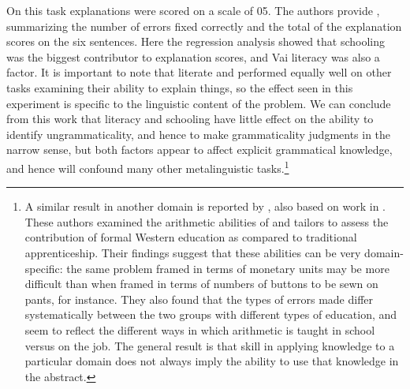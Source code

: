 \noindent
On this task explanations were scored on a scale of 0\textendash{}5. The authors provide , summarizing the number of errors fixed correctly and the total of the explanation scores on the six sentences. Here the regression analysis showed that schooling was the biggest contributor to explanation scores, and Vai literacy was also a factor. It is important to note that literate and  performed equally well on other tasks examining their ability to explain things, so the effect seen in this experiment is specific to the linguistic content of the problem. We can conclude from this work that literacy and schooling have little effect on the ability to identify ungrammaticality, and hence to make grammaticality judgments in the narrow sense, but both factors appear to affect explicit grammatical knowledge, and hence will confound many other metalinguistic tasks.\footnote{A similar result in another domain is reported by \citet{ReedEtAl1979}, also based on work in . These authors examined the arithmetic abilities of  and  tailors to assess the contribution of formal Western education as compared to traditional apprenticeship. Their findings suggest that these abilities can be very domain-specific: the same problem framed in terms of monetary units may be more difficult than when framed in terms of numbers of buttons to be sewn on pants, for instance. They also found that the types of errors made differ systematically between the two groups with different types of education, and seem to reflect the different ways in which arithmetic is taught in school versus on the job. The general result is that skill in applying knowledge to a particular domain does not always imply the ability to use that knowledge in the abstract.}

\begin{table}
\caption{Comparison of Vai Error Correction and Explanation as a Function of Literacy \citep{ScribnerEtAl1981}}
\label{tab:2}

\end{table}


